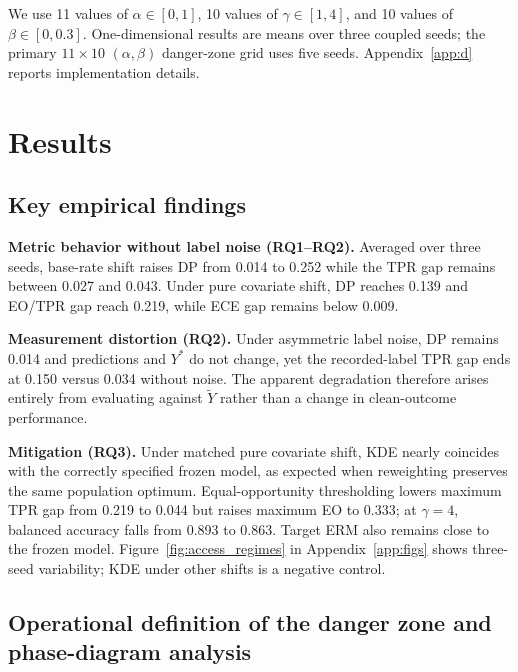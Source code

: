 \documentclass[11pt, letterpaper]{article}
\begin{document}
We use 11 values of $\alpha\in[0,1]$, 10 values of $\gamma\in[1,4]$, and 10 values of $\beta\in[0,0.3]$. One-dimensional results are means over three coupled seeds; the primary $11\times10$ $(\alpha,\beta)$ danger-zone grid uses five seeds. Appendix~\ref{app:d} reports implementation details.

\section{Results}

\subsection{Key empirical findings}
\label{sec:results}

\textbf{Metric behavior without label noise (RQ1--RQ2).} Averaged over three seeds, base-rate shift raises DP from 0.014 to 0.252 while the TPR gap remains between 0.027 and 0.043. Under pure covariate shift, DP reaches 0.139 and EO/TPR gap reach 0.219, while ECE gap remains below 0.009.

\textbf{Measurement distortion (RQ2).} Under asymmetric label noise, DP remains 0.014 and predictions and $Y^*$ do not change, yet the recorded-label TPR gap ends at 0.150 versus 0.034 without noise. The apparent degradation therefore arises entirely from evaluating against $\tilde{Y}$ rather than a change in clean-outcome performance.

\textbf{Mitigation (RQ3).} Under matched pure covariate shift, KDE nearly coincides with the correctly specified frozen model, as expected when reweighting preserves the same population optimum. Equal-opportunity thresholding lowers maximum TPR gap from 0.219 to 0.044 but raises maximum EO to 0.333; at $\gamma=4$, balanced accuracy falls from 0.893 to 0.863. Target ERM also remains close to the frozen model. Figure~\ref{fig:access_regimes} in Appendix~\ref{app:figs} shows three-seed variability; KDE under other shifts is a negative control.

\subsection{Operational definition of the danger zone and phase-diagram analysis}
\end{document}
